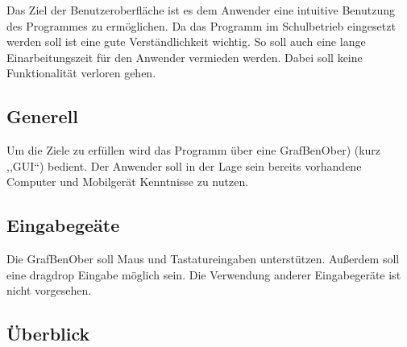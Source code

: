 \documentclass[parskip=full]{scrartcl}
\begin{document}
Das Ziel der Benutzeroberfläche ist es dem Anwender eine intuitive Benutzung des Programmes zu ermöglichen. Da das Programm im Schulbetrieb eingesetzt werden soll ist eine gute Verständlichkeit wichtig. So soll auch eine lange Einarbeitungszeit für den Anwender vermieden werden. Dabei soll keine Funktionalität verloren gehen.

\subsection{Generell}

Um die Ziele zu erfüllen wird das Programm über eine \gls{GrafBenOber}) (kurz ,,GUI``) bedient. Der Anwender soll in der Lage sein bereits vorhandene Computer und Mobilgerät Kenntnisse zu nutzen.

\subsection{Eingabegeäte}

Die \gls{GrafBenOber} soll Maus und Tastatureingaben unterstützen. Außerdem soll eine \gls{dragdrop} Eingabe möglich sein.
Die Verwendung anderer Eingabegeräte ist nicht vorgesehen.

\subsection{Überblick}
\end{document}
